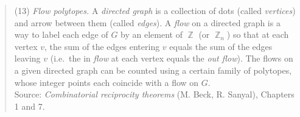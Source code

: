 \documentclass{amsart}
\DeclareMathOperator{\Z}{\mathbb{Z}}
\theoremstyle{plain}
\theoremstyle{remark}
\theoremstyle{definition}
\begin{document}
%
%
%
\noindent
\begin{quote}
  (13) \emph{Flow polytopes.}
  A \emph{directed graph} is a collection of dots (called \emph{vertices}) and
  arrow between them (called \emph{edges}). A \emph{flow} on a directed graph is a
  way to label each edge of $G$ by an element of $\Z$ (or $\Z_n$) so that at each
  vertex $v$, the sum of the edges entering $v$ equals the sum of the edges
  leaving $v$ (i.e.\ the in \emph{flow} at each vertex equals the \emph{out
  flow}). The flows on a given directed graph can be counted using a certain
  family of polytopes, whose integer points each coincide with a flow on $G$.
  \\[1em]
  \noindent
  Source:
  \emph{Combinatorial reciprocity theorems} (M. Beck, R. Sanyal), Chapters 1 and 7.
\end{quote}

\hrulefill

\end{document}
